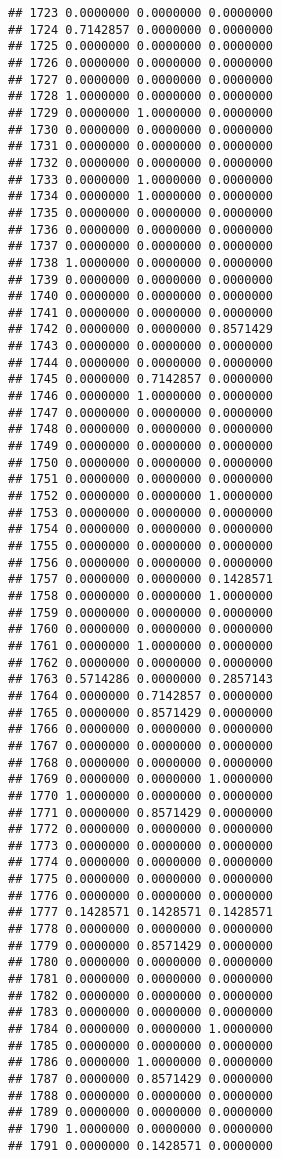\documentclass[
]{article}
\begin{document}
\begin{verbatim}
## 1723 0.0000000 0.0000000 0.0000000
## 1724 0.7142857 0.0000000 0.0000000
## 1725 0.0000000 0.0000000 0.0000000
## 1726 0.0000000 0.0000000 0.0000000
## 1727 0.0000000 0.0000000 0.0000000
## 1728 1.0000000 0.0000000 0.0000000
## 1729 0.0000000 1.0000000 0.0000000
## 1730 0.0000000 0.0000000 0.0000000
## 1731 0.0000000 0.0000000 0.0000000
## 1732 0.0000000 0.0000000 0.0000000
## 1733 0.0000000 1.0000000 0.0000000
## 1734 0.0000000 1.0000000 0.0000000
## 1735 0.0000000 0.0000000 0.0000000
## 1736 0.0000000 0.0000000 0.0000000
## 1737 0.0000000 0.0000000 0.0000000
## 1738 1.0000000 0.0000000 0.0000000
## 1739 0.0000000 0.0000000 0.0000000
## 1740 0.0000000 0.0000000 0.0000000
## 1741 0.0000000 0.0000000 0.0000000
## 1742 0.0000000 0.0000000 0.8571429
## 1743 0.0000000 0.0000000 0.0000000
## 1744 0.0000000 0.0000000 0.0000000
## 1745 0.0000000 0.7142857 0.0000000
## 1746 0.0000000 1.0000000 0.0000000
## 1747 0.0000000 0.0000000 0.0000000
## 1748 0.0000000 0.0000000 0.0000000
## 1749 0.0000000 0.0000000 0.0000000
## 1750 0.0000000 0.0000000 0.0000000
## 1751 0.0000000 0.0000000 0.0000000
## 1752 0.0000000 0.0000000 1.0000000
## 1753 0.0000000 0.0000000 0.0000000
## 1754 0.0000000 0.0000000 0.0000000
## 1755 0.0000000 0.0000000 0.0000000
## 1756 0.0000000 0.0000000 0.0000000
## 1757 0.0000000 0.0000000 0.1428571
## 1758 0.0000000 0.0000000 1.0000000
## 1759 0.0000000 0.0000000 0.0000000
## 1760 0.0000000 0.0000000 0.0000000
## 1761 0.0000000 1.0000000 0.0000000
## 1762 0.0000000 0.0000000 0.0000000
## 1763 0.5714286 0.0000000 0.2857143
## 1764 0.0000000 0.7142857 0.0000000
## 1765 0.0000000 0.8571429 0.0000000
## 1766 0.0000000 0.0000000 0.0000000
## 1767 0.0000000 0.0000000 0.0000000
## 1768 0.0000000 0.0000000 0.0000000
## 1769 0.0000000 0.0000000 1.0000000
## 1770 1.0000000 0.0000000 0.0000000
## 1771 0.0000000 0.8571429 0.0000000
## 1772 0.0000000 0.0000000 0.0000000
## 1773 0.0000000 0.0000000 0.0000000
## 1774 0.0000000 0.0000000 0.0000000
## 1775 0.0000000 0.0000000 0.0000000
## 1776 0.0000000 0.0000000 0.0000000
## 1777 0.1428571 0.1428571 0.1428571
## 1778 0.0000000 0.0000000 0.0000000
## 1779 0.0000000 0.8571429 0.0000000
## 1780 0.0000000 0.0000000 0.0000000
## 1781 0.0000000 0.0000000 0.0000000
## 1782 0.0000000 0.0000000 0.0000000
## 1783 0.0000000 0.0000000 0.0000000
## 1784 0.0000000 0.0000000 1.0000000
## 1785 0.0000000 0.0000000 0.0000000
## 1786 0.0000000 1.0000000 0.0000000
## 1787 0.0000000 0.8571429 0.0000000
## 1788 0.0000000 0.0000000 0.0000000
## 1789 0.0000000 0.0000000 0.0000000
## 1790 1.0000000 0.0000000 0.0000000
## 1791 0.0000000 0.1428571 0.0000000

\end{verbatim}
\end{document}
